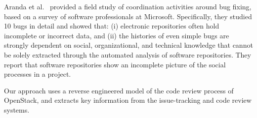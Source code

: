 \documentclass{llncs}
\begin{document}
Aranda et al.~\cite{con21} provided a field study of coordination activities around bug fixing, 
based on a survey of software professionals at Microsoft. Specifically, they studied 10 bugs in 
detail and showed that: (i) electronic repositories often hold incomplete or incorrect data, 
and (ii) the histories of even simple bugs are strongly dependent on social, organizational, and 
technical knowledge that cannot be solely extracted through the automated analysis of software
repositories. They report that software repositories show an incomplete picture of the social 
processes in a project.

Our approach uses a reverse engineered model of the code review process of OpenStack, and extracts 
key information from the issue-tracking and code review systems. 




\end{document}
